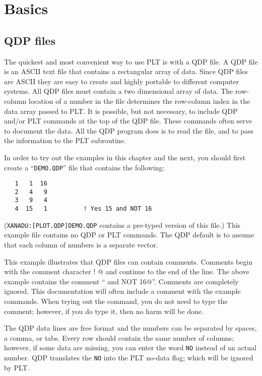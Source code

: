 \chapter{Basics}

\section{QDP files}
\label{qdpfiles}

The quickest and most convenient way to use PLT is with a QDP file.
A QDP file is an ASCII text file that contains a rectangular array
of data.
Since QDP files are ASCII they are easy to create and
highly portable to different computer systems.
All QDP files must contain a two dimensional array of data.
The row-column location of a number in the file determines the
row-column index in the data array passed to PLT.
It is possible, but not necessary,
to include QDP and/or PLT commands at the top of the QDP file.
These commands often serve to document the data.
All the QDP program does is to read the file,
and to pass the information to the PLT subroutine.

In order to try out the examples in this chapter and the next,
you should first create a ``{\tt DEMO.QDP}'' file that contains
the following:
\begin{verbatim}
   1   1  16
   2   4   9
   3   9   4
   4  15   1          ! Yes 15 and NOT 16
\end{verbatim}
({\tt XANADU:[PLOT.QDP]DEMO.QDP} contains a pre-typed version of this
file.)
This example file contains no QDP or PLT commands.
The QDP default is to assume that each column of numbers is a separate
vector.

This example illustrates that QDP files can contain comments.
Comments begin with the comment character \verb@ ! @
and continue to the end of the line.
The above example contains the comment `` and NOT 16@''.
Comments are completely ignored.
This documentation will often include a comment with the example commands.
When trying out the command,
you do not need to type the comment;
however, if you do type it, then no harm will be done.

The QDP data lines are free format
and the numbers can be separated by spaces, a comma, or tabs.
Every row should contain the same number of columns;
however, if some data are missing,
you can enter the word {\tt NO} instead of an actual number.
QDP translates the {\tt NO} into the PLT no-data flag;
which will be ignored by PLT.

